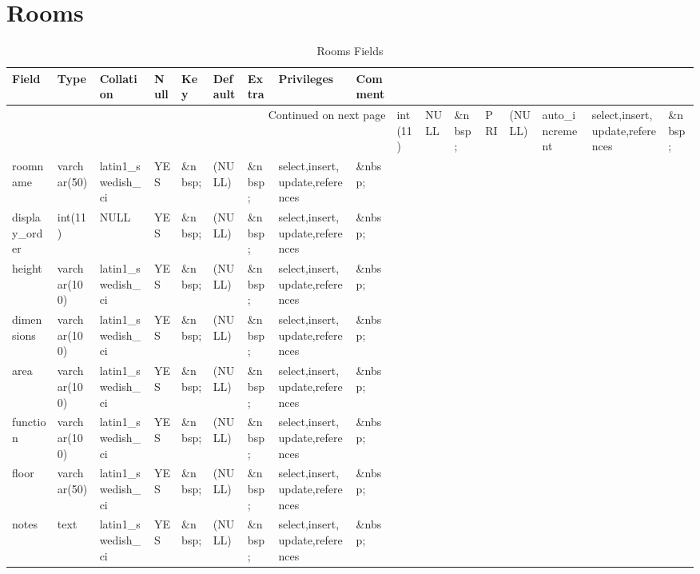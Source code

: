 \documentclass[tablesignature]{scrartcl}
\begin{document}
\section{Rooms}
\label{sec-22}


\begin{longtable}{|l|l|l|l|l|l|l|l|l|}
\caption{Rooms Fields} \label{tbl:roomsfields}\\
\hline
 Field             &  Type          &  Collation                &  Null     &  Key      &  Default  &  Extra              &  Privileges                       &  Comment \\
\hline
\endhead
\hline\multicolumn{9}{r}{Continued on next page}\
\endfoot
\endlastfoot
\hline
 roomid            &  int(11)       &  NULL                     &  \&nbsp;  &  PRI      &  (NULL)   &  auto\_{}increment  &  select,insert,update,references  &  \&nbsp;  \\
 roomname          &  varchar(50)   &  latin1\_{}swedish\_{}ci  &  YES      &  \&nbsp;  &  (NULL)   &  \&nbsp;            &  select,insert,update,references  &  \&nbsp;  \\
 display\_{}order  &  int(11)       &  NULL                     &  YES      &  \&nbsp;  &  (NULL)   &  \&nbsp;            &  select,insert,update,references  &  \&nbsp;  \\
 height            &  varchar(100)  &  latin1\_{}swedish\_{}ci  &  YES      &  \&nbsp;  &  (NULL)   &  \&nbsp;            &  select,insert,update,references  &  \&nbsp;  \\
 dimensions        &  varchar(100)  &  latin1\_{}swedish\_{}ci  &  YES      &  \&nbsp;  &  (NULL)   &  \&nbsp;            &  select,insert,update,references  &  \&nbsp;  \\
 area              &  varchar(100)  &  latin1\_{}swedish\_{}ci  &  YES      &  \&nbsp;  &  (NULL)   &  \&nbsp;            &  select,insert,update,references  &  \&nbsp;  \\
 function          &  varchar(100)  &  latin1\_{}swedish\_{}ci  &  YES      &  \&nbsp;  &  (NULL)   &  \&nbsp;            &  select,insert,update,references  &  \&nbsp;  \\
 floor             &  varchar(50)   &  latin1\_{}swedish\_{}ci  &  YES      &  \&nbsp;  &  (NULL)   &  \&nbsp;            &  select,insert,update,references  &  \&nbsp;  \\
 notes             &  text          &  latin1\_{}swedish\_{}ci  &  YES      &  \&nbsp;  &  (NULL)   &  \&nbsp;            &  select,insert,update,references  &  \&nbsp;  \\

\end{longtable}
\end{document}
